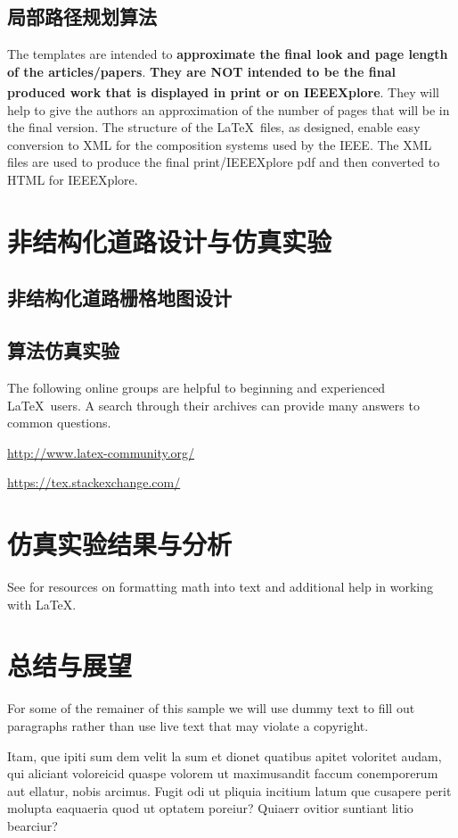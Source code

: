 \documentclass[lettersize,journal]{IEEEtran}
\begin{document}
\subsection{局部路径规划算法}
The templates are intended to {\bf{approximate the final look and page length of the articles/papers}}. {\bf{They are NOT intended to be the final produced work that is displayed in print or on IEEEXplore\textsuperscript{\textregistered}}}. They will help to give the authors an approximation of the number of pages that will be in the final version. The structure of the \LaTeX\ files, as designed, enable easy conversion to XML for the composition systems used by the IEEE. The XML files are used to produce the final print/IEEEXplore pdf and then converted to HTML for IEEEXplore.

\section{非结构化道路设计与仿真实验}
\subsection{非结构化道路栅格地图设计}
\subsection{算法仿真实验}
The following online groups are helpful to beginning and experienced \LaTeX\ users. A search through their archives can provide many answers to common questions.
\begin{list}{}{}
\item{\url{http://www.latex-community.org/}} 
\item{\url{https://tex.stackexchange.com/} }
\end{list}

\section{仿真实验结果与分析}
See \cite{ref1,ref2,ref3,ref4,ref5} for resources on formatting math into text and additional help in working with \LaTeX .

\section{总结与展望}
For some of the remainer of this sample we will use dummy text to fill out paragraphs rather than use live text that may violate a copyright.

Itam, que ipiti sum dem velit la sum et dionet quatibus apitet voloritet audam, qui aliciant voloreicid quaspe volorem ut maximusandit faccum conemporerum aut ellatur, nobis arcimus.
Fugit odi ut pliquia incitium latum que cusapere perit molupta eaquaeria quod ut optatem poreiur? Quiaerr ovitior suntiant litio bearciur?
\end{document}
